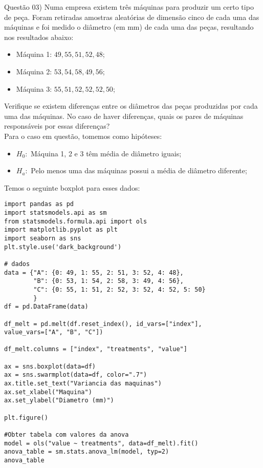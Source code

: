 
\noindent \textcolor{COLOR1}{Questão 03)} Numa empresa existem três máquinas para produzir um certo tipo de peça. Foram retiradas amostras aleatórias de dimensão cinco de cada uma das máquinas e foi medido o diâmetro (em mm) de cada uma das peças, resultando nos resultados abaixo:

\begin{itemize}
    \item Máquina 1: $49, 55, 51, 52, 48$;
    \item Máquina 2: $53, 54, 58, 49, 56$;
    \item Máquina 3: $55, 51, 52, 52, 52, 50$;
\end{itemize}

Verifique se existem diferenças entre os diâmetros das peças produzidas por cada uma das máquinas. No caso de haver diferenças, quais os pares de máquinas responsáveis por essas diferenças?
\\

Para o caso em questão, tomemos como hipóteses:
\begin{itemize}
    \item $H_0:$ Máquina 1, 2 e 3 têm média de diâmetro iguais;
    \item $H_a:$ Pelo menos uma das máquinas possui a média de diâmetro diferente;
\end{itemize}

Temos o seguinte boxplot para esses dados:\\

\begin{figure}[htbp]
    \centering
\end{figure}

\begin{lstlisting}
import pandas as pd
import statsmodels.api as sm
from statsmodels.formula.api import ols
import matplotlib.pyplot as plt
import seaborn as sns
plt.style.use('dark_background')

# dados
data = {"A": {0: 49, 1: 55, 2: 51, 3: 52, 4: 48}, 
        "B": {0: 53, 1: 54, 2: 58, 3: 49, 4: 56}, 
        "C": {0: 55, 1: 51, 2: 52, 3: 52, 4: 52, 5: 50}
        }
df = pd.DataFrame(data)

df_melt = pd.melt(df.reset_index(), id_vars=["index"],
value_vars=["A", "B", "C"])

df_melt.columns = ["index", "treatments", "value"]

ax = sns.boxplot(data=df)
ax = sns.swarmplot(data=df, color=".7")
ax.title.set_text("Variancia das maquinas")
ax.set_xlabel("Maquina")
ax.set_ylabel("Diametro (mm)")

plt.figure()

#Obter tabela com valores da anova
model = ols("value ~ treatments", data=df_melt).fit()
anova_table = sm.stats.anova_lm(model, typ=2)
anova_table
\end{lstlisting}

